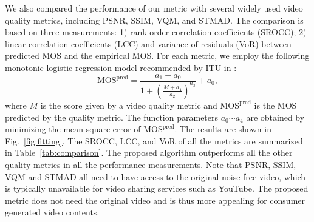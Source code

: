 \documentclass{sig-alternate}
\begin{document}
We also compared the performance of our metric with several widely used video quality metrics, including PSNR, SSIM, VQM, and STMAD. The comparison is based on three measurements: 1) rank order correlation coefficients (SROCC); 2) linear correlation coefficients (LCC) and variance of residuals (VoR) between predicted MOS and the empirical MOS. For each metric, we employ the following monotonic logistic regression model recommended by ITU in \cite{ITUValidation}:
\begin{equation}
\label{eq:regression}
\mathrm{MOS^{pred}} = \frac{a_1-a_0}{1+\left(\frac{M+a_4}{a_2}\right)^{a_3}} + a_0,
\end{equation}
where $M$ is the score given by a video quality metric and $\mathrm{MOS^{pred}}$ is the MOS predicted by the quality metric. The function parameters $a_0\cdots a_4$ are obtained by minimizing the mean square error of $\mathrm{MOS^{pred}}$. The results are shown in Fig.~\ref{fig:fitting}. The SROCC, LCC, and VoR of all the metrics are summarized in Table~\ref{tab:comparison}. The proposed algorithm outperforms all the other quality metrics in all the performance measurements. Note that PSNR, SSIM, VQM and STMAD all need to have access to the original noise-free video, which is typically unavailable for video sharing services such as YouTube. The proposed metric does not need the original video and is thus more appealing for consumer generated video contents.

\begin{table}
\centering
\caption{\label{tab:comparison}Performance comparison with other full-reference quality metrics.}
\end{table} 
\end{document}
